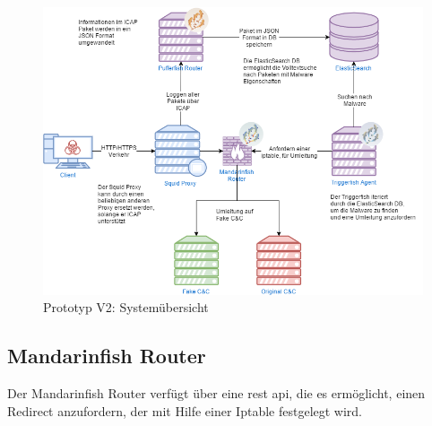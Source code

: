 \begin{figure}[H]
	\centering
	\includegraphics[width=\textwidth]{img/P2-Systemubersicht.png}
	\caption{Prototyp V2: Systemübersicht}
	\label{fig:Prototyp V2 Systemübersicht}
\end{figure}




\subsection{Mandarinfish Router}
Der Mandarinfish Router verfügt über eine \gls{rest} \gls{api}, die es ermöglicht, einen Redirect anzufordern, der mit Hilfe einer Iptable festgelegt wird.

